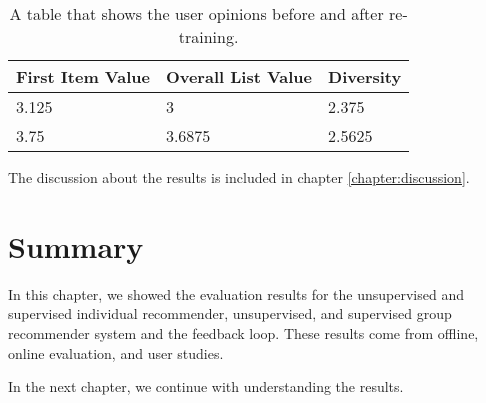 \begin{table}[htp]
	\caption[Online evaluation]{A table that shows the user opinions before and after re-training.}\label{tab:online-evaluation}
	\centering
	\begin{tabular}{l l l}
		\toprule
		First Item Value & Overall List Value & Diversity \\
		\midrule
		3.125 & 3 & 2.375\\
		3.75 & 3.6875 & 2.5625 \\
		\bottomrule
	\end{tabular}
\end{table}

The discussion about the results is included in chapter \ref{chapter:discussion}.

\section{Summary}

In this chapter, we showed the evaluation results for the unsupervised and supervised individual recommender, unsupervised, and supervised group recommender system and the feedback loop. These results come from offline, online evaluation, and user studies. 

In the next chapter, we continue with understanding the results.

